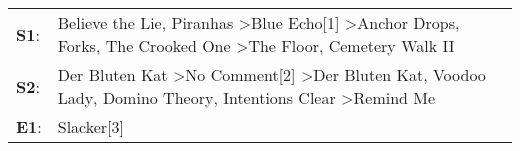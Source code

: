 \begin{supertabular}{p{0.03\textwidth}p{0.92\textwidth}}
 \textbf{S1}:  &  Believe the Lie\textsuperscript{}, \enspace Piranhas\textsuperscript{} \textgreater \enspace Blue Echo[1]\textsuperscript{} \textgreater \enspace Anchor Drops\textsuperscript{}, \enspace Forks\textsuperscript{}, \enspace The Crooked One\textsuperscript{} \textgreater \enspace The Floor\textsuperscript{}, \enspace Cemetery Walk II\textsuperscript{}  \enspace  \\
 \textbf{S2}:  &                                 Der Bluten Kat\textsuperscript{} \textgreater \enspace No Comment[2]\textsuperscript{} \textgreater \enspace Der Bluten Kat\textsuperscript{}, \enspace Voodoo Lady\textsuperscript{}, \enspace Domino Theory\textsuperscript{}, \enspace Intentions Clear\textsuperscript{} \textgreater \enspace Remind Me\textsuperscript{}  \enspace  \\
 \textbf{E1}:  &                                                                                                                                                                                                                                                                                                                                   Slacker[3]\textsuperscript{}  \enspace  \\
\end{supertabular}
